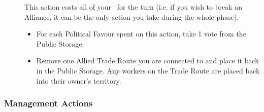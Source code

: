 \documentclass[10pt,twocolumn]{article}
\begin{document}
\begin{description}
\item[] This action costs all of your \polf\ for the turn (i.e. if you wish to break an Alliance, it can be the only action you take during the whole  phase).
\begin{itemize}
\item For each Political Favour spent on this action, take 1 vote from the Public Storage.
\item Remove one Allied Trade Route you are connected to and place it back in the Public Storage. Any workers on the Trade Route are placed back into their owner's territory.
\end{itemize}
\end{description}

\subsubsection{Management Actions}
\end{document}
